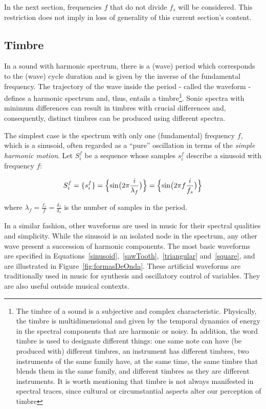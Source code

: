 In the next section, frequencies $f$ that do not divide $f_s$ will be considered. This restriction does not imply in loss of generality of this current section's content.

\subsection{Timbre}
In a sound with harmonic spectrum, there is a (wave) period which corresponds to the (wave) cycle duration and is given by the inverse of the fundamental frequency. The trajectory of the wave inside the period - called the waveform - defines a harmonic spectrum and, thus, entails a timbre\footnote{The timbre of a sound is a subjective and complex characteristic. Physically, the timbre is multidimensional and given by the temporal dynamics of energy in the spectral components that are harmonic or noisy. In addition, the word timbre is used to designate different things: one same note can have (be produced with) different timbres, an instrument has different timbres, two instruments of the same family have, at the same time, the same timbre that blends them in the same family, and different timbres as they are different instruments. It is worth mentioning that timbre is not always manifested in spectral traces, since cultural or circumstantial aspects alter our perception of timbre}. Sonic spectra with minimum differences can result in timbres with crucial differences and, consequently, distinct timbres can be produced using different spectra\cite{Roederer}.

The simplest case is the spectrum with only one (fundamental) frequency $f$, which is a sinusoid, often regarded as a ``pure'' oscillation in terms of the \emph{simple harmonic motion}. Let $S_i^f$ be a sequence whose samples $s_i^f$ describe a sinusoid with frequency $f$:

\begin{equation}\label{sinusoid}
     S^f_i=\{ s^f_i \}=\Bigl\{ \sin\bigl(2\pi \frac{i}{\lambda_f} \bigr)  \Bigr\} = \Bigl\{ \sin\bigl(2\pi f \frac{i}{f_s}\bigr)  \Bigr\} 
\end{equation}

\noindent where $\lambda_f=\frac{f_s}{f}=\frac{\delta_f}{\delta_s}$ is the number of samples in the period.

In a similar fashion, other waveforms are used in music for their spectral qualities and simplicity. While the sinusoid is an isolated node in the spectrum, any other wave present a succession of harmonic components. The most basic waveforms are specified in Equations~\ref{sinusoid},~\ref{sawTooth},~\ref{triangular} and~\ref{square}, and are illustrated in Figure~\ref{fig:formasDeOnda}.
These artificial waveforms are traditionally used in music for synthesis and oscillatory control of variables. They are also useful outside musical contexts\cite{Openheim}.

